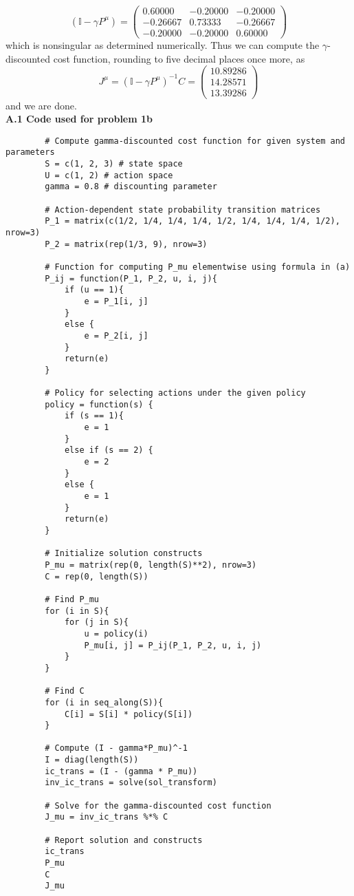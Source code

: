 \documentclass[11pt, letterpaper]{article}
\newcommand{\mbb}[1]{\mathbb{#1}}
\begin{document}
    \[(\mbb{I}-\gamma P^\mu)=\begin{pmatrix}
        0.60000 & -0.20000 & -0.20000\\
        -0.26667 & 0.73333 & -0.26667\\
        -0.20000 & -0.20000 & 0.60000
    \end{pmatrix}\]
    which is nonsingular as determined numerically. Thus we can compute the $\gamma$-discounted cost function, rounding to five decimal places once more, as
    \[J^\mu=(\mbb{I}-\gamma P^\mu)^{-1}C=\begin{pmatrix}
        10.89286\\
        14.28571\\
        13.39286
    \end{pmatrix}\]
    and we are done.\\[10pt]
    {\bf A.1 Code used for problem 1b}
    \begin{verbatim}
        # Compute gamma-discounted cost function for given system and parameters
        S = c(1, 2, 3) # state space
        U = c(1, 2) # action space
        gamma = 0.8 # discounting parameter

        # Action-dependent state probability transition matrices
        P_1 = matrix(c(1/2, 1/4, 1/4, 1/4, 1/2, 1/4, 1/4, 1/4, 1/2), nrow=3)
        P_2 = matrix(rep(1/3, 9), nrow=3)

        # Function for computing P_mu elementwise using formula in (a)
        P_ij = function(P_1, P_2, u, i, j){
            if (u == 1){
                e = P_1[i, j]
            }
            else {
                e = P_2[i, j]
            }
            return(e)
        }

        # Policy for selecting actions under the given policy
        policy = function(s) {
            if (s == 1){
                e = 1
            }
            else if (s == 2) {
                e = 2
            }
            else {
                e = 1
            }
            return(e)
        }

        # Initialize solution constructs
        P_mu = matrix(rep(0, length(S)**2), nrow=3)
        C = rep(0, length(S))

        # Find P_mu
        for (i in S){
            for (j in S){
                u = policy(i)
                P_mu[i, j] = P_ij(P_1, P_2, u, i, j)
            }
        }

        # Find C
        for (i in seq_along(S)){
            C[i] = S[i] * policy(S[i])
        }

        # Compute (I - gamma*P_mu)^-1
        I = diag(length(S))
        ic_trans = (I - (gamma * P_mu))
        inv_ic_trans = solve(sol_transform)

        # Solve for the gamma-discounted cost function
        J_mu = inv_ic_trans %*% C

        # Report solution and constructs
        ic_trans
        P_mu
        C
        J_mu
    \end{verbatim}
\end{document}
